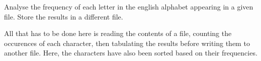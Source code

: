 

\problem Analyse the frequency of each letter in the english alphabet appearing in a given file. Store the results
in a different file.

\solution
All that has to be done here is reading the contents of a file, counting the occurences of each character, then tabulating
the results before writing them to another file. Here, the characters have also been sorted based on their frequencies.
